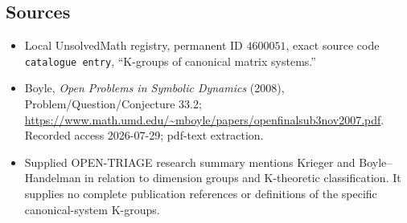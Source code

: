 \documentclass[11pt]{article}
\begin{document}
\subsection{Sources}
\begin{itemize}
\item Local UnsolvedMath registry, permanent ID \(4600051\), exact source code \texttt{catalogue entry}, ``K-groups of canonical matrix systems.''
\item Boyle, \emph{Open Problems in Symbolic Dynamics} (2008), Problem/Question/Conjecture 33.2; \url{https://www.math.umd.edu/~mboyle/papers/openfinalsub3nov2007.pdf}. Recorded access 2026-07-29; pdf-text extraction.
\item Supplied OPEN-TRIAGE research summary mentions Krieger and Boyle--Handelman in relation to dimension groups and K-theoretic classification. It supplies no complete publication references or definitions of the specific canonical-system K-groups.
\end{itemize}
\end{document}
